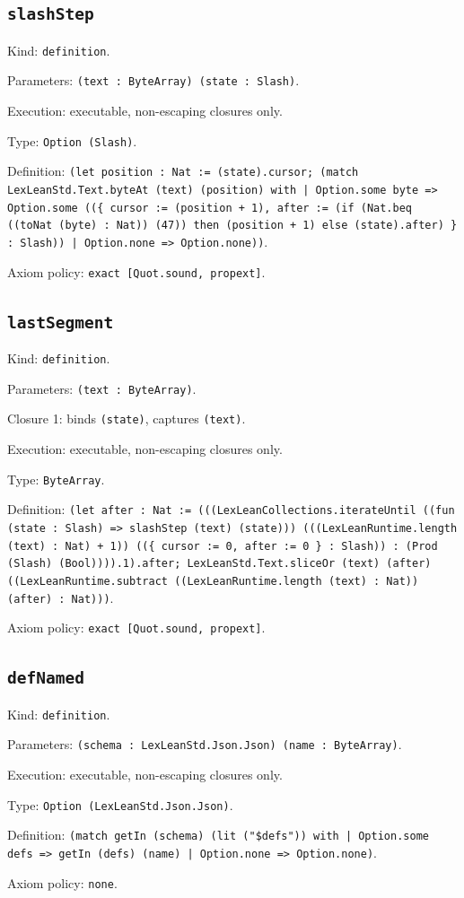 \documentclass[11pt]{article}
\begin{document}
\subsection*{\texttt{slashStep}}
\noindent Kind: \texttt{definition}.\par
\noindent Parameters: \texttt{(text : ByteArray) (state : Slash)}.\par
\noindent Execution: executable, non-escaping closures only.\par
\noindent Type: \texttt{Option (Slash)}.\par
\noindent Definition: \texttt{(let position : Nat := (state).cursor; (match LexLeanStd.Text.byteAt (text) (position) with | Option.some byte => Option.some ((\{ cursor := (position + 1), after := (if (Nat.beq ((toNat (byte) : Nat)) (47)) then (position + 1) else (state).after) \} : Slash)) | Option.none => Option.none))}.\par
\noindent Axiom policy: \texttt{exact [Quot.sound, propext]}.\par
\subsection*{\texttt{lastSegment}}
\noindent Kind: \texttt{definition}.\par
\noindent Parameters: \texttt{(text : ByteArray)}.\par
\noindent Closure 1: binds \texttt{(state)}, captures \texttt{(text)}.\par
\noindent Execution: executable, non-escaping closures only.\par
\noindent Type: \texttt{ByteArray}.\par
\noindent Definition: \texttt{(let after : Nat := (((LexLeanCollections.iterateUntil ((fun (state : Slash) => slashStep (text) (state))) (((LexLeanRuntime.length (text) : Nat) + 1)) ((\{ cursor := 0, after := 0 \} : Slash)) : (Prod (Slash) (Bool)))).1).after; LexLeanStd.Text.sliceOr (text) (after) ((LexLeanRuntime.subtract ((LexLeanRuntime.length (text) : Nat)) (after) : Nat)))}.\par
\noindent Axiom policy: \texttt{exact [Quot.sound, propext]}.\par
\subsection*{\texttt{defNamed}}
\noindent Kind: \texttt{definition}.\par
\noindent Parameters: \texttt{(schema : LexLeanStd.Json.Json) (name : ByteArray)}.\par
\noindent Execution: executable, non-escaping closures only.\par
\noindent Type: \texttt{Option (LexLeanStd.Json.Json)}.\par
\noindent Definition: \texttt{(match getIn (schema) (lit ("\$defs")) with | Option.some defs => getIn (defs) (name) | Option.none => Option.none)}.\par
\noindent Axiom policy: \texttt{none}.\par
\end{document}
